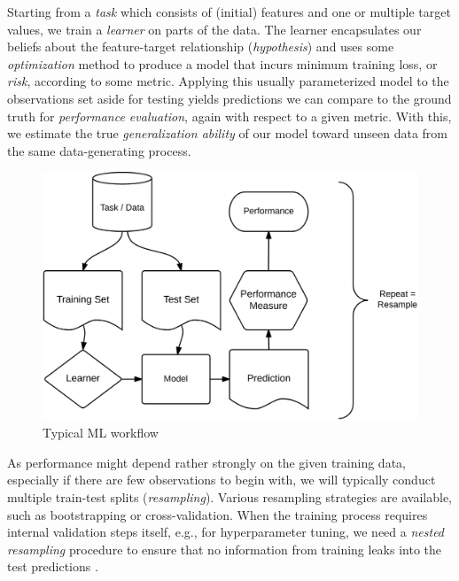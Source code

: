 \begin{minipage}[b]{0.45\textwidth}
  Starting from a \textit{task} which consists of (initial) features and one or 
  multiple target values, we train a \textit{learner} on parts of the data.
  The learner encapsulates our beliefs about the feature-target relationship 
  (\textit{hypothesis}) and uses some \textit{optimization} method to produce a 
  model that incurs minimum training loss, or \textit{risk}, according to some 
  metric.
  Applying this usually parameterized model to the observations set aside for 
  testing yields predictions we can compare to the ground truth for 
  \textit{performance evaluation}, again with respect to a given metric. 
  With this, we estimate the true \textit{generalization ability} of our model 
toward unseen data from the same data-generating process.
\end{minipage}%
\begin{minipage}[b]{0.05\textwidth}
  \phantom{foo}
\end{minipage}%
\begin{minipage}[b]{0.5\textwidth}
  \begin{figure}[H]
    \begin{center}
      \includegraphics[width = \textwidth]{figures/supervised_learning_schema}
    \end{center}
  \caption[Typical ML workflow]{Typical ML workflow \citep{mlr3book}}
  \label{fig_ml_workflow}
  \end{figure}
\end{minipage}%

\vspace{0.3cm}

As performance might depend rather strongly on the given training data, 
especially if there are few observations to begin with, we will typically 
conduct multiple train-test splits (\textit{resampling}).
Various resampling strategies are available, such as bootstrapping or 
cross-validation.
When the training process requires internal validation steps itself, e.g., for 
hyperparameter tuning, we need a \textit{nested resampling} procedure to ensure 
that no information from training leaks into the test predictions 
\citep{japkowiczshah2011}. 
\\

